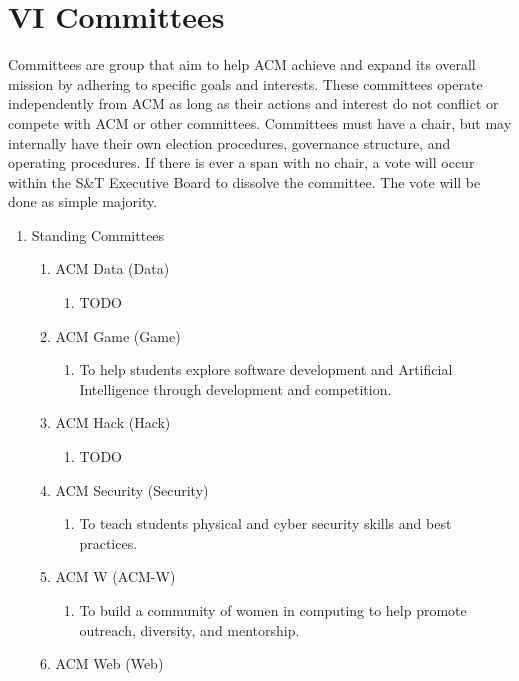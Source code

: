 
\section{VI \textendash{} Committees}
Committees are group that aim to help ACM achieve and expand its overall mission
by adhering to specific goals and interests. These committees operate
independently from ACM as long as their actions and interest do not conflict or
compete with ACM or other committees. Committees must have a chair, but may
internally have their own election procedures, governance structure, and
operating procedures. If there is ever a span with no chair, a vote will occur
within the S\&T Executive Board to dissolve the committee. The vote will be done
as simple majority.
\begin{enumerate}[label=\Alph*.]
  \item Standing Committees
    \begin{enumerate}
      \item ACM Data (Data)
        \begin{enumerate}
          \item TODO
        \end{enumerate}
      \item ACM Game (Game)
        \begin{enumerate}
          \item To help students explore software development and Artificial
            Intelligence through development and competition.
        \end{enumerate}
      \item ACM Hack (Hack)
        \begin{enumerate}
          \item TODO
        \end{enumerate}
      \item ACM Security (Security)
        \begin{enumerate}
          \item To teach students physical and cyber security skills and best
            practices.
        \end{enumerate}
      \item ACM W (ACM-W)
        \begin{enumerate}
          \item To build a community of women in computing to help promote
            outreach, diversity, and mentorship.
        \end{enumerate}
      \item ACM Web (Web)

\end{enumerate}
\end{enumerate}
